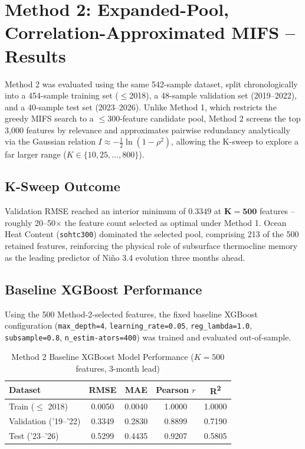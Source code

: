 \section{Method 2: Expanded-Pool, Correlation-Approximated MIFS -- Results}

Method 2 was evaluated using the same 542-sample dataset, split chronologically into a 454-sample training set ($\leq$2018), a 48-sample validation set (2019--2022), and a 40-sample test set (2023--2026). Unlike Method 1, which restricts the greedy MIFS search to a $\leq 300$-feature candidate pool, Method 2 screens the top 3,000 features by relevance and approximates pairwise redundancy analytically via the Gaussian relation $I \approx -\tfrac{1}{2}\ln(1-\rho^2)$, allowing the K-sweep to explore a far larger range ($K \in \{10, 25, \ldots, 800\}$).

\subsection{K-Sweep Outcome}
Validation RMSE reached an interior minimum of $0.3349$ at $\mathbf{K=500}$ features -- roughly 20--50$\times$ the feature count selected as optimal under Method 1. Ocean Heat Content (\texttt{sohtc300}) dominated the selected pool, comprising 213 of the 500 retained features, reinforcing the physical role of subsurface thermocline memory as the leading predictor of Ni\~{n}o 3.4 evolution three months ahead.

\subsection{Baseline XGBoost Performance}
Using the 500 Method-2-selected features, the fixed baseline XGBoost configuration (\texttt{max\_depth=4}, \texttt{learning\_rate=0.05}, \texttt{reg\_lambda=1.0}, \texttt{subsample=0.8}, \texttt{n\_estim\linebreak -ators=400}) was trained and evaluated out-of-sample.

\begin{table}[H]
\centering
\caption{Method 2 Baseline XGBoost Model Performance ($K=500$ features, 3-month lead)}
\label{tab:xgb_metrics_m2}
\normalsize
\renewcommand{\arraystretch}{1.2}
\begin{tabular}{|l|c|c|c|c|}
\hline
\textbf{Dataset} & \textbf{RMSE} & \textbf{MAE} & \textbf{Pearson $r$} & \textbf{R\textsuperscript{2}} \\
\hline
Train ($\leq$ 2018) & 0.0050 & 0.0040 & 1.0000 & 1.0000 \\
\hline
Validation ('19--'22) & 0.3349 & 0.2830 & 0.8899 & 0.7190 \\
\hline
Test ('23--'26) & 0.5299 & 0.4435 & 0.9207 & 0.5805 \\
\hline
\end{tabular}
\end{table}

